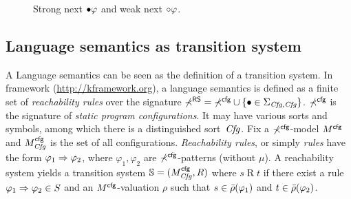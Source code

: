 \documentclass{almostllncs}
\begin{document}
\begin{figure}
	\caption{Strong next ${\bullet} \varphi$ and weak next ${\circ} \varphi$.}
	\label{fig:snext-vs-wnext}
\end{figure}

\subsection{Language semantics as transition system}
A Language semantics can be seen as the definition of a transition system.
In \K framework (\url{http://kframework.org}), a language semantics is defined as a finite set of \emph{reachability rules} over the signature $\mathbb{\Sigma}^{\textnormal{\textsf{RS}}} = \mathbb{\Sigma}^{\textnormal{\textsf{cfg}}} \cup \{ {\bullet} \in \Sigma_{ \mathit{Cfg} , \mathit{Cfg} } \} $.
$\mathbb{\Sigma}^{\textnormal{\textsf{cfg}}}$ is the signature of \emph{static program configurations}. 
It may have various sorts and symbols, among which there is a distinguished sort~$\mathit{Cfg}$.
Fix a $\mathbb{\Sigma}^{\textnormal{\textsf{cfg}}}$-model $M^{\textnormal{\textsf{cfg}}}$ and $M^{\textnormal{\textsf{cfg}}}_{\mathit{Cfg}}$ is the set of all configurations.
\emph{Reachability rules}, or simply \emph{rules} have the form
$\varphi_1 \Rightarrow \varphi_2$, where $\varphi_1,\varphi_2$ are $\mathbb{\Sigma}^{\textnormal{\textsf{cfg}}}$-patterns (without $\mu$).
A reachability system yields a transition system $\mathbb{S} = (M^{\textnormal{\textsf{cfg}}}_{\mathit{Cfg}},R)$ where
$s \mathbin{R} t$ if there exist a rule $\varphi_1 \Rightarrow \varphi_2 \in S$
and an $M^{\textnormal{\textsf{cfg}}}$-valuation $\rho$ such that
$s \in \bar{\rho}(\varphi_1)$ and $t \in \bar{\rho}(\varphi_2)$.
\end{document}
